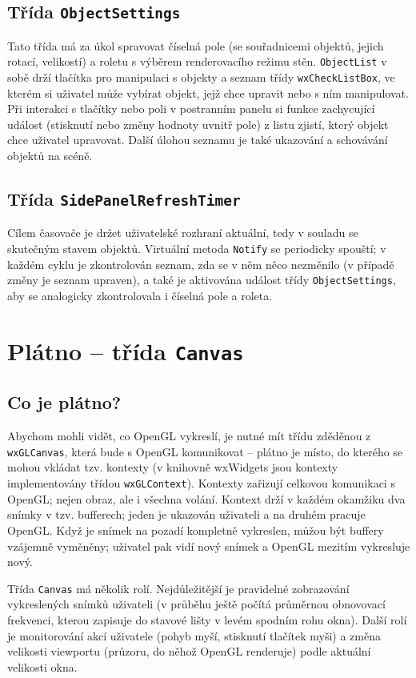 \documentclass[a4paper, 11pt]{report}
\begin{document}
\subsection{Třída \texttt{ObjectSettings}}
Tato třída má za úkol spravovat číselná pole (se souřadnicemi objektů, jejich rotací, velikostí) a roletu s výběrem renderovacího režimu stěn. \texttt{ObjectList} v sobě drží tlačítka pro manipulaci s objekty a seznam třídy \texttt{wxCheckListBox}, ve kterém si uživatel může vybírat objekt, jejž chce upravit nebo s ním manipulovat. Při interakci s tlačítky nebo poli v postranním panelu si funkce zachycující událost (stisknutí nebo změny hodnoty uvnitř pole) z listu zjistí, který objekt chce uživatel upravovat. Další úlohou seznamu je také ukazování a schovávání objektů na scéně.

\subsection{Třída \texttt{SidePanelRefreshTimer}}
Cílem časovače je držet uživatelské rozhraní aktuální, tedy v souladu se skutečným stavem objektů. Virtuální metoda \texttt{Notify} se periodicky spouští; v každém cyklu je zkontrolován seznam, zda se v něm něco nezměnilo (v případě změny je seznam upraven), a také je aktivována událost třídy \texttt{ObjectSettings}, aby se analogicky zkontrolovala i číselná pole a roleta.

\section{Plátno -- třída \texttt{Canvas}}
\subsection{Co je plátno?}
Abychom mohli vidět, co OpenGL vykreslí, je nutné mít třídu zděděnou z \texttt{wxGLCanvas}, která bude s OpenGL komunikovat -- plátno je místo, do kterého se mohou vkládat tzv. kontexty (v knihovně wxWidgets jsou kontexty implementovány třídou \texttt{wxGLContext}). Kontexty zařizují celkovou komunikaci s OpenGL; nejen obraz, ale i všechna volání. Kontext drží v každém okamžiku dva snímky v tzv. bufferech; jeden je ukazován uživateli a na druhém pracuje OpenGL. Když je snímek na pozadí kompletně vykreslen, můžou být buffery vzájemně vyměněny; uživatel pak vidí nový snímek a OpenGL mezitím vykresluje nový.

Třída \texttt{Canvas} má několik rolí. Nejdůležitější je pravidelné zobrazování vykreslených snímků uživateli (v průběhu ještě počítá průměrnou obnovovací frekvenci, kterou zapisuje do stavové lišty v levém spodním rohu okna). Další rolí je monitorování akcí uživatele (pohyb myší, stisknutí tlačítek myši) a změna velikosti viewportu (průzoru, do něhož OpenGL renderuje) podle aktuální velikosti okna.
\end{document}
